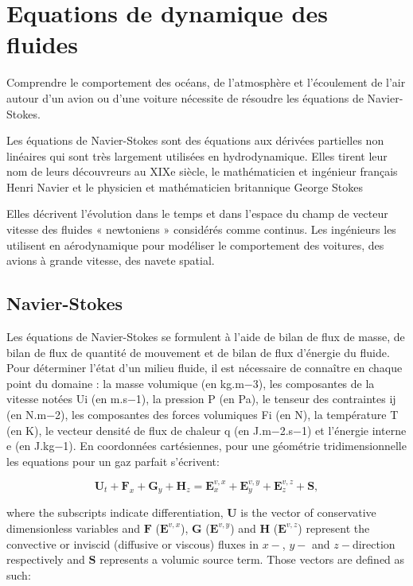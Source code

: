 \section{Equations de dynamique des fluides}

Comprendre le comportement des océans, de l'atmosphère et l'écoulement de l'air autour d'un avion ou d'une voiture nécessite de résoudre les équations de Navier-Stokes.

Les équations de Navier-Stokes sont des équations aux dérivées partielles non linéaires qui sont très largement utilisées en hydrodynamique. Elles tirent leur nom de leurs découvreurs au XIXe siècle, le mathématicien et ingénieur français Henri Navier et le physicien et mathématicien britannique George Stokes

Elles décrivent l'évolution dans le temps et dans l'espace du champ de vecteur vitesse des fluides « newtoniens » considérés comme continus. Les ingénieurs les utilisent en aérodynamique pour modéliser le comportement des voitures, des avions à grande vitesse, des navete spatial.


\subsection {Navier-Stokes}
Les équations de Navier-Stokes se formulent à l’aide de bilan de flux de masse, de bilan de flux de quantité de mouvement et de bilan de flux d’énergie du fluide. Pour déterminer l’état d’un milieu fluide, il est nécessaire de connaître en chaque point du domaine : la masse volumique (en kg.m−3), les composantes de la vitesse notées Ui (en m.s−1), la pression P (en Pa), le tenseur des contraintes ij (en N.m−2), les composantes des forces volumiques Fi (en N), la température T (en K), le vecteur densité de flux de chaleur q (en J.m−2.s−1) et l’énergie interne e (en J.kg−1).
En coordonnées cartésiennes, pour une géométrie tridimensionnelle les equations pour un gaz parfait s'écrivent:



\begin{equation}
    \mathbf{U}_t + \mathbf{F}_x + \mathbf{G}_y + \mathbf{H}_z = \mathbf{E}_x^{v,x} + \mathbf{E}_y^{v,y} + \mathbf{E}_z^{v,z} + \mathbf{S},
    \label{eq:cons_ns}
\end{equation}

where the subscripts indicate differentiation, $\mathbf{U}$ is the vector of conservative dimensionless variables and $\mathbf{F}$ ($\mathbf{E}^{v,x}$), $\mathbf{G}$ ($\mathbf{E}^{v,y}$) and $\mathbf{H}$ ($\mathbf{E}^{v,z}$) represent the convective or inviscid (diffusive or viscous) fluxes in $x-$, $y-$ and $z-$direction respectively and $\mathbf{S}$ represents a volumic source term.
Those vectors are defined as such:\\

